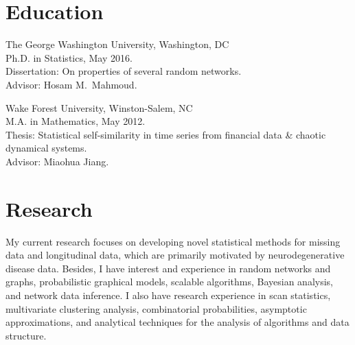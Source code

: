 \documentclass[margin]{res}
\begin{document}
\begin{resume} 
	
\section{Education} 
The George Washington University, Washington, DC \\
Ph.D. in Statistics, May 2016. \\
Dissertation: On properties of several random networks. \\
Advisor: Hosam M.\ Mahmoud.

Wake Forest University, Winston-Salem, NC \\
M.A. in Mathematics, May 2012. \\
Thesis: Statistical self-similarity in time series from financial data \& chaotic dynamical systems. \\
Advisor: Miaohua Jiang.
	
\section{Research}
My current research focuses on developing novel statistical methods 
for missing data and longitudinal data, which are primarily 
motivated by neurodegenerative disease data. Besides, I have 
interest and experience in random networks and graphs, probabilistic 
graphical models, scalable algorithms, Bayesian
analysis, and network data inference. I also have research 
experience in scan statistics, multivariate clustering analysis, 
combinatorial probabilities, asymptotic approximations, and 
analytical techniques for the analysis of algorithms and data 
structure.
 	


\end{resume}
\end{document}

